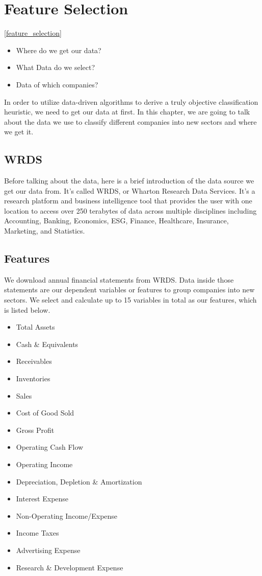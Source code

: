 \documentclass[../main.tex]{subfiles}
\begin{document}
\chapter{Feature Selection} \ref{feature_selection}
  
\begin{itemize}
    \item Where do we get our data?
    \item What Data do we select?
    \item Data of which companies?
\end{itemize}

In order to utilize data-driven algorithms to derive a truly objective classification heuristic, we need to get our data at first. In this chapter, we are going to talk about the data we use to classify different companies into new sectors and where we get it.

\section{WRDS}

Before talking about the data, here is a brief introduction of the data source we get our data from. It's called WRDS, or Wharton Research Data Services. It's a research platform and business intelligence tool that provides the user with one location to access over 250 terabytes of data across multiple disciplines including Accounting, Banking, Economics, ESG, Finance, Healthcare, Insurance, Marketing, and Statistics. 

\section{Features}

We download annual financial statements from WRDS. Data inside those statements are our dependent variables or features to group companies into new sectors. We select and calculate up to 15 variables in total as our features, which is listed below.

\begin{itemize}
    \item Total Assets
    \item Cash \& Equivalents
    \item Receivables
    \item Inventories
    \item Sales
    \item Cost of Good Sold
    \item Gross Profit
    \item Operating Cash Flow
    \item Operating Income
	\item Depreciation, Depletion \& Amortization
	\item Interest Expense
	\item Non-Operating Income/Expense
	\item Income Taxes
	\item Advertising Expense
	\item Research \& Development Expense
	\\~\\
\end{itemize}
\end{document}
